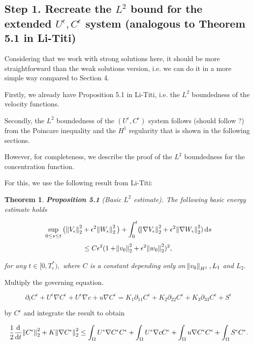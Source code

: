 \documentclass[11pt]{article}
\newtheorem{theorem}{Theorem}
\newcommand*\diff{\mathop{}\!\mathrm{d}}
\begin{document}
\subsection{Step 1. Recreate the $L^2$ bound for the extended $U^\epsilon, C^\epsilon$ system (analogous to Theorem 5.1 in Li-Titi)}

Considering that we work with strong solutions here, it should be more straightforward than the weak solutions version, i.e. we can do it in a more simple way compared to Section 4.

Firstly, we already have Proposition 5.1 in Li-Titi, i.e. the $L^2$ boundedness of the velocity functions.

Secondly, the $L^2$ boundedness of the $(U^\epsilon, C^\epsilon)$ system follows (should follow ?) from the Poincare inequality and the $H^1$ regularity that is shown in the following sections.

However, for completeness, we describe the proof of the $L^2$ boundedness for the concentration function.

For this, we use the following result from Li-Titi:

\begin{theorem}
\textbf{Proposition 5.1} (Basic $L^2$ estimate). The following basic energy estimate holds

  $$ \sup_{0 \leq s \leq t}{\big ( \norm{V_\epsilon}_2^2 + \epsilon^2 \norm{W_\epsilon}_2^2 \big ) } + \int_0^t ( \norm{\nabla V_\epsilon}_2^2 + \epsilon^2 \norm{\nabla W_\epsilon}_2^2) \diff s $$
  $$ \leq C \epsilon^2 (1 + \norm{v_0}_2^2 + \epsilon^2 \norm{w_0}^2_2)^2,$$

for any $t \in [0, T^*_\epsilon),$ where $C$ is a constant depending only on $\norm{v_0}_{H^1}, L_1$ and $L_2.$

\end{theorem}

Multiply the governing equation.

$$ \partial_t C^\epsilon + U^\epsilon \nabla C^\epsilon  + U^\epsilon \nabla c+ u \nabla C^\epsilon = K_1 \partial_{11} C^\epsilon + K_2 \partial_{22} C^\epsilon + K_3 \partial_{33} C^\epsilon + S^\epsilon $$

by $C^\epsilon$ and integrate the result to obtain
 
\begin{equation} \nonumber
  \frac{1}{2}\frac{\diff}{\diff t} \norm{C^\epsilon}_2^2 + K \norm{\nabla C^\epsilon}_2^2 \leq \int_\Omega U^\epsilon \nabla C^\epsilon C^\epsilon  + \int_\Omega U^\epsilon \nabla c C^\epsilon + \int_\Omega u \nabla C^\epsilon C^\epsilon + \int_\Omega S^\epsilon C^\epsilon.
\end{equation}
\end{document}
